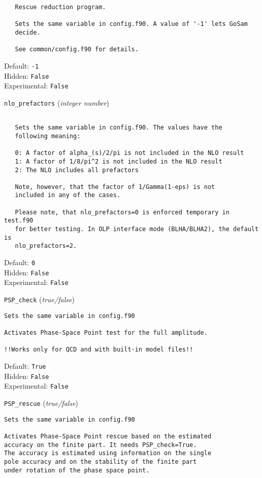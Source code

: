 \begin{basedescript}{\desclabelstyle{\pushlabel}}
\begin{verbatim}
   Rescue reduction program.

   Sets the same variable in config.f90. A value of '-1' lets GoSam
   decide.

   See common/config.f90 for details.
\end{verbatim}
Default: \verb|-1|
\\Hidden: \verb|False|
\\Experimental: \verb|False|
\\\item[\colorbox{gray!30}{\texttt{nlo\_prefactors}}] (\textit{integer number})
\begin{verbatim}

   Sets the same variable in config.f90. The values have the
   following meaning:

   0: A factor of alpha_(s)/2/pi is not included in the NLO result
   1: A factor of 1/8/pi^2 is not included in the NLO result
   2: The NLO includes all prefactors

   Note, however, that the factor of 1/Gamma(1-eps) is not
   included in any of the cases.

   Please note, that nlo_prefactors=0 is enforced temporary in test.f90
   for better testing. In OLP interface mode (BLHA/BLHA2), the default is
   nlo_prefactors=2.
\end{verbatim}
Default: \verb|0|
\\Hidden: \verb|False|
\\Experimental: \verb|False|
\\\item[\colorbox{gray!30}{\texttt{PSP\_check}}] (\textit{true/false})
\begin{verbatim}
Sets the same variable in config.f90

Activates Phase-Space Point test for the full amplitude.

!!Works only for QCD and with built-in model files!!
\end{verbatim}
Default: \verb|True|
\\Hidden: \verb|False|
\\Experimental: \verb|False|
\\\item[\colorbox{gray!30}{\texttt{PSP\_rescue}}] (\textit{true/false})
\begin{verbatim}
Sets the same variable in config.f90

Activates Phase-Space Point rescue based on the estimated
accuracy on the finite part. It needs PSP_check=True.
The accuracy is estimated using information on the single
pole accuracy and on the stability of the finite part
under rotation of the phase space point.


\end{verbatim}
\end{basedescript}
